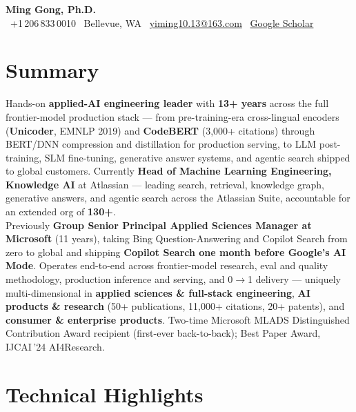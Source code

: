 \documentclass[10.5pt,letterpaper]{article}
\begin{document}
\begin{center}
  {\LARGE\bfseries\color{blue!60!black} Ming Gong, Ph.D.}\\[3pt]
  \faPhone \ +1\,206\,833\,0010 \quad \textbar \quad
  \faMapMarker* \ Bellevue, WA \quad \textbar \quad
  \faEnvelope \ \href{mailto:yiming10.13@163.com}{yiming10.13@163.com} \quad \textbar \quad
  \faGraduationCap \ \href{https://scholar.google.com/citations?user=c7JEFwsAAAAJ}{Google Scholar}
\end{center}

\section*{Summary}
Hands-on \textbf{applied-AI engineering leader} with \textbf{13+ years} across the full frontier-model production stack --- from pre-training-era cross-lingual encoders (\textbf{Unicoder}, EMNLP 2019) and \textbf{CodeBERT} (3,000+ citations) through BERT/DNN compression and distillation for production serving, to LLM post-training, SLM fine-tuning, generative answer systems, and agentic search shipped to global customers. Currently \textbf{Head of Machine Learning Engineering, Knowledge AI} at Atlassian --- leading search, retrieval, knowledge graph, generative answers, and agentic search across the Atlassian Suite, accountable for an extended org of \textbf{130+}.\\[4pt]
Previously \textbf{Group Senior Principal Applied Sciences Manager at Microsoft} (11 years), taking Bing Question-Answering and Copilot Search from zero to global and shipping \textbf{Copilot Search one month before Google's AI Mode}. Operates end-to-end across frontier-model research, eval and quality methodology, production inference and serving, and 0$\to$1 delivery --- uniquely multi-dimensional in \textbf{applied sciences \& full-stack engineering}, \textbf{AI products \& research} (50+ publications, 11,000+ citations, 20+ patents), and \textbf{consumer \& enterprise products}. Two-time Microsoft MLADS Distinguished Contribution Award recipient (first-ever back-to-back); Best Paper Award, IJCAI\,'24 AI4Research.

\section*{Technical Highlights}
\end{document}
